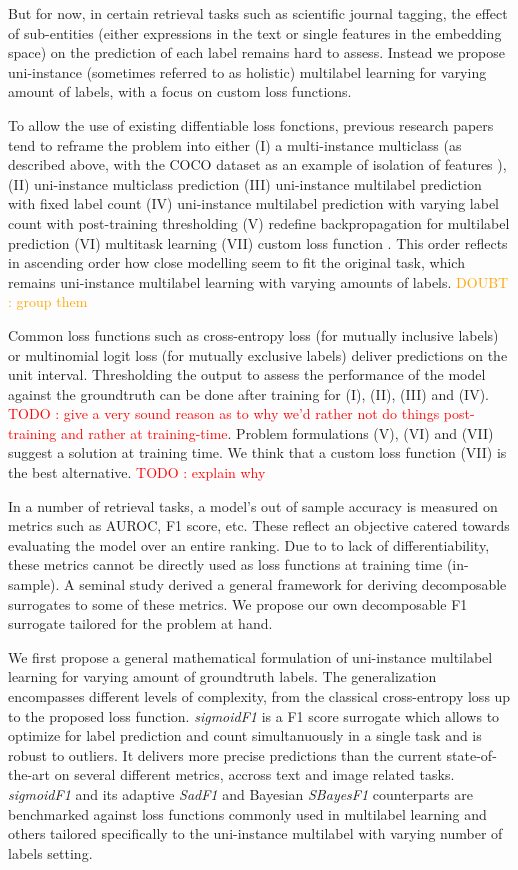 \documentclass[sigconf,natbib,screen=true,review=true,anonymous]{acmart}
\newcommand\todo[1]{\textcolor{red}{TODO : #1}}
\newcommand\doubt[1]{\textcolor{orange}{DOUBT : #1}}
\begin{document}
But for now, in certain retrieval tasks such as scientific journal tagging, the effect of sub-entities (either expressions in the text or single features in the embedding space) on the prediction of each label remains hard to assess. Instead we propose uni-instance (sometimes referred to as holistic) multilabel learning for varying amount of labels, with a focus on custom loss functions.

To allow the use of existing diffentiable loss fonctions, previous research papers tend to reframe the problem into either (I) a multi-instance multiclass (as described above, with the COCO dataset as an example of isolation of features \cite{COCO}), (II) uni-instance multiclass prediction (III) uni-instance multilabel prediction with fixed label count (IV) uni-instance multilabel prediction with varying label count with post-training thresholding (V) redefine backpropagation for multilabel prediction \cite{multilabelBackprop} (VI) multitask learning \cite{multitaskLabel} (VII) custom loss function \cite{tencent}. This order reflects in ascending order how close modelling seem to fit the original task, which remains uni-instance multilabel learning with varying amounts of labels. \doubt{group them}

Common loss functions such as cross-entropy loss (for mutually inclusive labels) or multinomial logit loss (for mutually exclusive labels) deliver predictions on the unit interval. Thresholding the output to assess the performance of the model against the groundtruth can be done after training for (I), (II), (III) and (IV). \todo{give a very sound reason as to why we'd rather not do things post-training and rather at training-time}. Problem formulations (V), (VI) and (VII) suggest a solution at training time. We think that a custom loss function (VII) is the best alternative. \todo{explain why}

In a number of retrieval tasks, a model's out of sample accuracy is measured on metrics such as AUROC, F1 score, etc. These reflect an objective catered towards evaluating the model over an entire ranking. Due to to lack of differentiability, these metrics cannot be directly used as loss functions at training time (in-sample). A seminal study \cite{optimizableLosses} derived a general framework for deriving decomposable surrogates to some of these metrics. We propose our own decomposable F1 surrogate tailored for the problem at hand.

We first propose a general mathematical formulation of uni-instance multilabel learning for varying amount of groundtruth labels. The generalization encompasses different levels of complexity, from the classical cross-entropy loss up to the proposed loss function. \emph{sigmoidF1} is a F1 score surrogate which allows to optimize for label prediction and count simultanuously in a single task and is robust to outliers. It delivers more precise predictions than the current state-of-the-art on several different metrics, accross text and image related tasks. \emph{sigmoidF1} and its adaptive \emph{SadF1} and Bayesian \emph{SBayesF1} counterparts are benchmarked against loss functions commonly used in multilabel learning and others tailored specifically to the uni-instance multilabel with varying number of labels setting.
\end{document}
